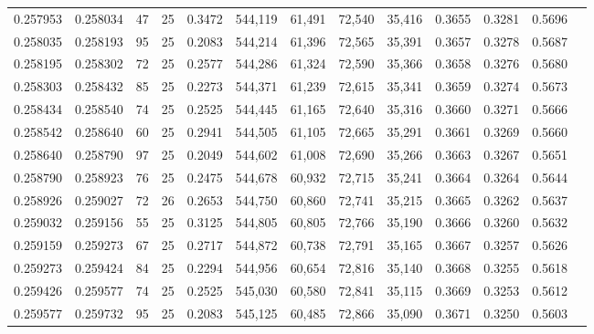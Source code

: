\begin{tabular}{rrrrrrrrrrrrr}
0.257953 & 0.258034 &    47 &  25 &                                     0.3472 & 544,119 &  61,491 &  72,540 &  35,416 & 0.3655 & 0.3281 & 0.5696 \\
0.258035 & 0.258193 &    95 &  25 &                                     0.2083 & 544,214 &  61,396 &  72,565 &  35,391 & 0.3657 & 0.3278 & 0.5687 \\
0.258195 & 0.258302 &    72 &  25 &                                     0.2577 & 544,286 &  61,324 &  72,590 &  35,366 & 0.3658 & 0.3276 & 0.5680 \\
0.258303 & 0.258432 &    85 &  25 &                                     0.2273 & 544,371 &  61,239 &  72,615 &  35,341 & 0.3659 & 0.3274 & 0.5673 \\
0.258434 & 0.258540 &    74 &  25 &                                     0.2525 & 544,445 &  61,165 &  72,640 &  35,316 & 0.3660 & 0.3271 & 0.5666 \\
0.258542 & 0.258640 &    60 &  25 &                                     0.2941 & 544,505 &  61,105 &  72,665 &  35,291 & 0.3661 & 0.3269 & 0.5660 \\
0.258640 & 0.258790 &    97 &  25 &                                     0.2049 & 544,602 &  61,008 &  72,690 &  35,266 & 0.3663 & 0.3267 & 0.5651 \\
0.258790 & 0.258923 &    76 &  25 &                                     0.2475 & 544,678 &  60,932 &  72,715 &  35,241 & 0.3664 & 0.3264 & 0.5644 \\
0.258926 & 0.259027 &    72 &  26 &                                     0.2653 & 544,750 &  60,860 &  72,741 &  35,215 & 0.3665 & 0.3262 & 0.5637 \\
0.259032 & 0.259156 &    55 &  25 &                                     0.3125 & 544,805 &  60,805 &  72,766 &  35,190 & 0.3666 & 0.3260 & 0.5632 \\
0.259159 & 0.259273 &    67 &  25 &                                     0.2717 & 544,872 &  60,738 &  72,791 &  35,165 & 0.3667 & 0.3257 & 0.5626 \\
0.259273 & 0.259424 &    84 &  25 &                                     0.2294 & 544,956 &  60,654 &  72,816 &  35,140 & 0.3668 & 0.3255 & 0.5618 \\
0.259426 & 0.259577 &    74 &  25 &                                     0.2525 & 545,030 &  60,580 &  72,841 &  35,115 & 0.3669 & 0.3253 & 0.5612 \\
0.259577 & 0.259732 &    95 &  25 &                                     0.2083 & 545,125 &  60,485 &  72,866 &  35,090 & 0.3671 & 0.3250 & 0.5603 \\

\end{tabular}
